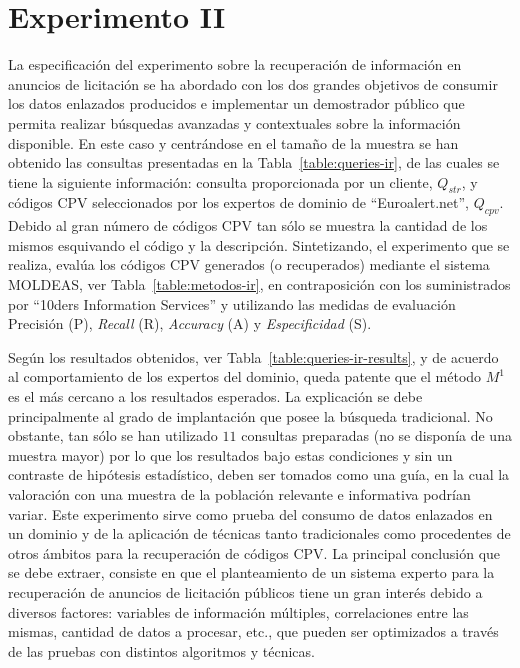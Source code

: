 \documentclass[a4paper,final,11pt,fleqn,twoside]{book}  %
\begin{document}
\section{Experimento II}
La especificación del experimento sobre la recuperación de información en anuncios de licitación se ha abordado 
con los dos grandes objetivos de consumir los datos enlazados producidos e implementar un demostrador público que permita realizar 
búsquedas avanzadas y contextuales sobre la información disponible.  En este caso y centrándose en el 
tamaño de la muestra se han obtenido las consultas presentadas en la Tabla~\ref{table:queries-ir}, de las 
cuales se tiene la siguiente información: consulta proporcionada por un cliente, $Q_{str}$, y códigos CPV seleccionados por los expertos 
de dominio de ``Euroalert.net'', $Q_{cpv}$. Debido al gran número de códigos CPV tan sólo se muestra la cantidad de los mismos esquivando 
el código y la descripción.  Sintetizando, el experimento que se realiza, evalúa los códigos CPV generados (o recuperados) mediante el sistema MOLDEAS, 
ver Tabla~\ref{table:metodos-ir}, en contraposición con los suministrados por ``10ders Information Services'' y utilizando las medidas de evaluación Precisión (P), \textit{Recall} (R), \textit{Accuracy} (A) y 
\textit{Especificidad} (S). 

Según los resultados obtenidos, ver Tabla~\ref{table:queries-ir-results}, y de acuerdo al comportamiento de los expertos del dominio, queda patente que el 
método $M^1$ es el más cercano a los resultados esperados. La explicación se debe principalmente al grado de implantación que 
posee la búsqueda tradicional. No obstante, tan sólo se han utilizado $11$ consultas \linebreak preparadas (no se disponía de una muestra mayor) 
por lo que los resultados bajo estas condiciones y sin un contraste de hipótesis estadístico, deben ser tomados como una guía, en la cual la valoración con una muestra 
de la población relevante e informativa podrían variar. Este experimento sirve como prueba del consumo de datos enlazados en un 
dominio y de la aplicación de técnicas tanto tradicionales como procedentes de otros ámbitos para la recuperación de códigos CPV. 
La principal conclusión que se debe extraer, consiste en que el planteamiento de un sistema experto para la recuperación de anuncios de licitación 
públicos tiene un gran interés debido a diversos factores: variables de información múltiples, correlaciones entre las mismas, 
cantidad de datos a procesar, etc., que pueden ser optimizados a través de las pruebas con distintos algoritmos y técnicas.
\end{document}
